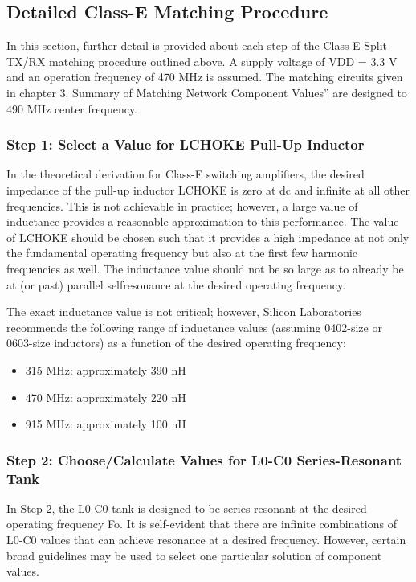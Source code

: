     \subsection{Detailed Class-E Matching Procedure}
      In this section, further detail is provided about each step of the Class-E Split TX/RX matching 
      procedure outlined above. A supply voltage of VDD = 3.3 V and an operation frequency of 470 MHz is 
      assumed. The matching circuits given in chapter 3. Summary of Matching Network Component Values” are 
      designed to 490 MHz center frequency.
      
      \subsubsection{Step 1: Select a Value for LCHOKE Pull-Up Inductor}
        In the theoretical derivation for Class-E switching amplifiers, the desired impedance of the 
        pull-up inductor LCHOKE is zero at dc and infinite at all other frequencies. This is not achievable 
        in practice; however, a large value of inductance provides a reasonable approximation to this 
        performance. The value of LCHOKE should be chosen such that it provides a high impedance at not 
        only the fundamental operating frequency but also at the first few harmonic frequencies as well. 
        The inductance value should not be so large as to already be at (or past) parallel selfresonance at 
        the desired operating frequency.
        
        The exact inductance value is not critical; however, Silicon Laboratories recommends the following 
        range of inductance values (assuming 0402-size or 0603-size inductors) as a function of the desired 
        operating frequency:
        \begin{itemize}
          \item 315 MHz: approximately 390 nH
          \item 470 MHz: approximately 220 nH
          \item 915 MHz: approximately 100 nH
        \end{itemize}
        
      \subsubsection{Step 2: Choose/Calculate Values for L0-C0 Series-Resonant Tank}
        In Step 2, the L0-C0 tank is designed to be series-resonant at the desired operating frequency Fo. 
        It is self-evident that there are infinite combinations of L0-C0 values that can achieve resonance 
        at a desired frequency. However, certain broad guidelines may be used to select one particular 
        solution of component values.
        

